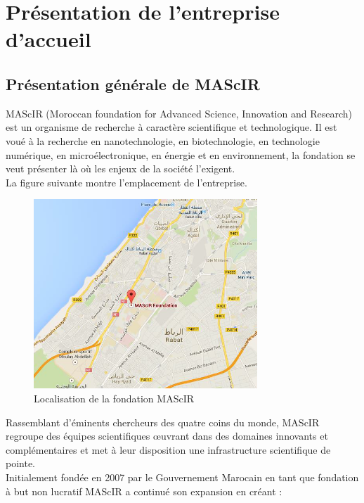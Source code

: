 \documentclass[11pt, a4paper, twoside]{book}
\begin{document}
\pagestyle{plain}

\chapter{Présentation de l'entreprise d'accueil}
\pagestyle{headings}
\section{Présentation générale de MAScIR}
MAScIR (Moroccan foundation for Advanced Science, Innovation and Research) est un organisme de recherche à caractère scientifique et technologique. Il est voué à la recherche en nanotechnologie, en biotechnologie, en technologie numérique, en microélectronique, en énergie et en environnement, la fondation se veut présenter là où les enjeux de la société l’exigent.\\

La figure suivante montre l’emplacement de l’entreprise.

\begin{figure}[h]
\centering
\includegraphics[width=0.75\textwidth]{mascir_map}
\caption{Localisation de la fondation MAScIR}
\end{figure}

Rassemblant d’éminents chercheurs des quatre coins du monde, MAScIR regroupe des équipes scientifiques œuvrant dans des domaines innovants et complémentaires et met à leur disposition une infrastructure scientifique de pointe.\\

Initialement fondée en 2007 par le Gouvernement Marocain en tant que fondation à but non lucratif MAScIR a continué son expansion en créant :
\end{document}
